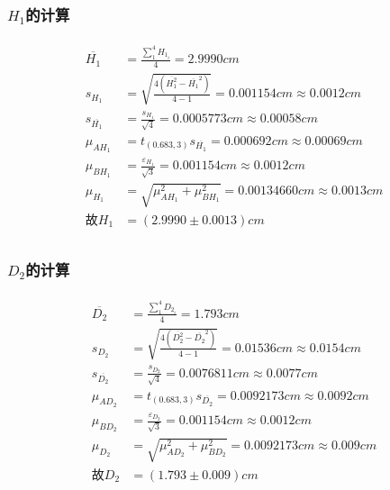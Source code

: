 \documentclass[12pt,a4paper,UTF8]{ctexart}
\begin{document}
\subsubsection*{$H_1$的计算}
\begin{align*}
	\begin{aligned}
	\overline{H_1}&=\frac{\sum_{1}^{4}H_{1_i}}{4}=2.9990cm\\
	s_{H_{1}}&=\sqrt{\frac{4(\overline{H_1^2}-\overline{H_1}^2)}{4-1}}=0.001154cm\approx 0.0012cm\\
	s_{\overline{H_1}} &= \frac{s_{H_{1}}}{\sqrt{4}} = 0.0005773cm\approx 0.00058cm\\
	\mu_{AH_1} &= t_{(0.683,3)}s_{\overline{H_1}} = 0.000692cm\approx0.00069cm\\
	\mu_{BH_1} &= \frac{\varepsilon_{H_1}}{\sqrt{3}} = 0.001154cm\approx 0.0012cm\\
	\mu_{H_1} &= \sqrt{\mu_{AH_1}^2+\mu_{BH_1}^2}=0.00134660cm\approx 0.0013cm\\
	\text{故}H_1 &= (2.9990 \pm 0.0013)cm \\
	\end{aligned}
\end{align*}
\subsubsection*{$D_2$的计算}
\begin{align*}
	\begin{aligned}
	\overline{D_2}&=\frac{\sum_{1}^{4}D_{2_i}}{4}=1.793cm\\
	s_{D_{2}}&=\sqrt{\frac{4(\overline{D_2^2}-\overline{D_2}^2)}{4-1}}=0.01536cm\approx 0.0154cm\\
	s_{\overline{D_2}} &= \frac{s_{D_{2}}}{\sqrt{4}} = 0.0076811cm\approx 0.0077cm\\
	\mu_{AD_2} &= t_{(0.683,3)}s_{\overline{D_2}} = 0.0092173cm\approx 0.0092cm\\
	\mu_{BD_2} &= \frac{\varepsilon_{D_2}}{\sqrt{3}} = 0.001154cm\approx 0.0012cm\\
	\mu_{D_2} &= \sqrt{\mu_{AD_2}^2+\mu_{BD_2}^2}=0.0092173cm\approx 0.009cm\\
	\text{故}D_2 &= (1.793 \pm 0.009)cm \\
	\end{aligned}
\end{align*}
\end{document}
